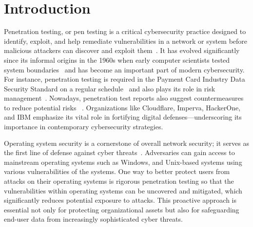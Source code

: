 \documentclass[manuscript,acmsmall,anonymous,review,screen,nonacm=true, authorversion=true]{acmart}
\begin{document}
\section{Introduction}


    
Penetration testing, or pen testing is a critical cybersecurity practice designed to identify, exploit, and help remediate vulnerabilities in a network or system before malicious attackers can discover and exploit them~\cite{henry2012penetration}. It has evolved significantly since its informal origins in the 1960s when early computer scientists tested system boundaries~\cite{hunt2011us} and has become an important part of modern cybersecurity. For instance, penetration testing is required in the Payment Card Industry Data Security Standard on a regular schedule~\cite{lybrand2013use} and also plays its role in risk management~\cite{maclean2017nist}. Nowadays, penetration test reports also suggest countermeasures to reduce potential risks ~\cite{engebretson2013basics}. Organizations like Cloudflare, Imperva, HackerOne, and IBM emphasize its vital role in fortifying digital defenses—underscoring its importance in contemporary cybersecurity strategies.

Operating system security is a cornerstone of overall network security; it serves as the first line of defense against cyber threats~\cite{stallings2012operating}. Adversaries can gain access to mainstream operating systems such as Windows, and Unix-based systems using various vulnerabilities of the systems. One way to better protect users from attacks on their operating systems is rigorous penetration testing so that the vulnerabilities within operating systems can be uncovered and mitigated, which significantly reduces potential exposure to attacks. This proactive approach is essential not only for protecting organizational assets but also for safeguarding end-user data from increasingly sophisticated cyber threats.
\end{document}
